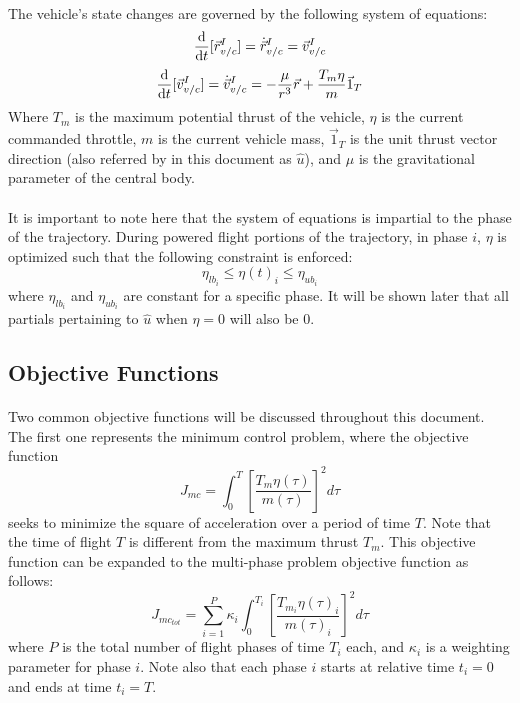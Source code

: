 \paragraph{}
The vehicle's state changes are governed by the following system of equations:
\begin{equation}
\dv{}{t}[\vec{r}_{v/c}^I]=\dot{\vec{r}}_{v/c}^I=
\vec{v}_{v/c}^I
\end{equation}
\begin{equation}
\dv{}{t}[\vec{v}_{v/c}^I]=\dot{\vec{v}}_{v/c}^I=
-\frac{\mu}{r^3}\vec{r} + \frac{T_m \eta}{m}\vec{1}_T
\end{equation}
Where $T_m$ is the maximum potential thrust of the vehicle, $\eta$ is the current commanded throttle, $m$ is the current vehicle mass, $\vec{1}_T$ is the unit thrust vector direction (also referred by in this document as $\hat{u}$), and $\mu$ is the gravitational parameter of the central body.
\paragraph{}
It is important to note here that the system of equations is impartial to the phase of the trajectory. During powered flight portions of the trajectory, in phase $i$, $\eta$ is optimized such that the following constraint is enforced:
\begin{equation}
\eta_{{lb}_i} \leq \eta(t)_i \leq \eta_{{ub}_i}
\end{equation}
where $\eta_{{lb}_i}$ and $\eta_{{ub}_i}$ are constant for a specific phase. It will be shown later that all partials pertaining to $\hat{u}$ when $\eta = 0$ will also be $0$.

\subsection{Objective Functions}
\paragraph{}
Two common objective functions will be discussed throughout this document. The first one represents the minimum control problem, where the objective function
\begin{equation}
J_{mc} = \int_{0}^{T} \left[\frac{T_m \eta(\tau)}{m(\tau)}\right]^2 d\tau
\end{equation}
seeks to minimize the square of acceleration over a period of time $T$. Note that the time of flight $T$ is different from the maximum thrust $T_m$. This objective function can be expanded to the multi-phase problem objective function as follows:
\begin{equation}
J_{mc_{tot}} = \sum_{i=1}^{P} \kappa_i \int_{0}^{T_i} \left[\frac{T_{m_i} \eta(\tau)_i}{m(\tau)_i}\right]^2 d\tau
\end{equation}
where $P$ is the total number of flight phases of time $T_i$ each, and $\kappa_i$ is a weighting parameter for phase $i$. Note also that each phase $i$ starts at relative time $t_i = 0$ and ends at time $t_i = T$.
